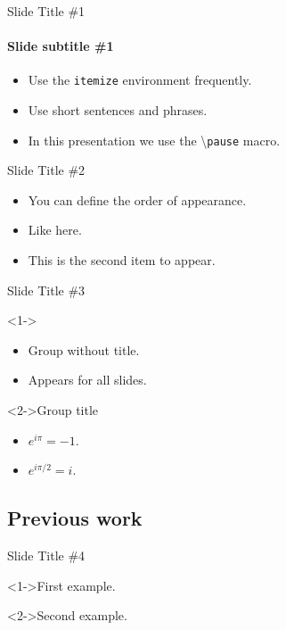 \documentclass{beamer}
\begin{document}
\begin{frame}{Slide Title \#1}
	\framesubtitle{Slide subtitle \#1}
	\begin{itemize}
		\item Use the \texttt{itemize} environment frequently.
		\pause
		\item Use short sentences and phrases.
		\pause
		\item In this presentation we use the \textbackslash{}\texttt{pause} macro.
	\end{itemize}
\end{frame}

\begin{frame}{Slide Title \#2}
	\begin{itemize}
		\item <1->You can define the order of appearance.
		\item <3->Like here.
		\item <2->This is the second item to appear.
	\end{itemize}
\end{frame}

\begin{frame}{Slide Title \#3}
	\begin{block}
		<1->{}
		\begin{itemize}
			\item Group without title.
			\item Appears for all slides.
		\end{itemize}
	\end{block}
	\begin{exampleblock}
		<2->{Group title}
		\begin{itemize}
			\item $e^{i\pi}=-1$.
			\item $e^{i\pi/2}=i$.
		\end{itemize}
	\end{exampleblock}
\end{frame}

\subsection{Previous work}

\begin{frame}{Slide Title \#4}
	\begin{example}
		<1->First example. 
	\end{example}
	\begin{example}
		<2->Second example.
	\end{example}
\end{frame}
\end{document}

